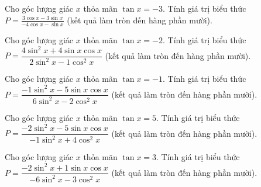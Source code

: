 \documentclass[12pt,a4paper]{article}
\begin{document}
\begin{ex}
 Cho góc lượng giác ${x}$ thỏa mãn $\tan x=-3$. Tính giá trị biểu thức $P=\frac{3 \cos x - 3 \sin x}{- 4 \cos x - \sin x}$ (kết quả làm tròn đến hàng phần mười).\\ 

\end{ex}

\begin{ex}[Cho tanx (hoặc cotx). Tìm $P=\dfrac{a\sin^2 x+b\sin x\cos x}{c\sin^2 x+d\cos^2 x}$]
 Cho góc lượng giác ${x}$ thỏa mãn $\tan x=-2$. Tính giá trị biểu thức $P=\dfrac{4\sin^2 x +4\sin x \cos x}{2\sin^2x-1\cos^2x}$ (kết quả làm tròn đến hàng phần mười).\\ 

\end{ex}

\begin{ex}
 Cho góc lượng giác ${x}$ thỏa mãn $\tan x=-1$. Tính giá trị biểu thức $P=\dfrac{-1\sin^2 x -5\sin x \cos x}{6\sin^2x-2\cos^2x}$ (kết quả làm tròn đến hàng phần mười).\\ 

\end{ex}

\begin{ex}
 Cho góc lượng giác ${x}$ thỏa mãn $\tan x=5$. Tính giá trị biểu thức $P=\dfrac{-2\sin^2 x -5\sin x \cos x}{-1\sin^2x+4\cos^2x}$ (kết quả làm tròn đến hàng phần mười).\\ 

\end{ex}

\begin{ex}
 Cho góc lượng giác ${x}$ thỏa mãn $\tan x=3$. Tính giá trị biểu thức $P=\dfrac{-2\sin^2 x +1\sin x \cos x}{-6\sin^2x-3\cos^2x}$ (kết quả làm tròn đến hàng phần mười).\\ 

\end{ex}
\end{document}
